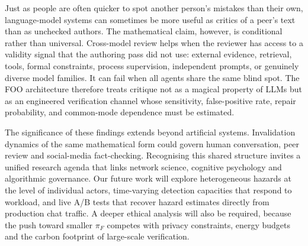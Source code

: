 \documentclass[12pt]{article}
\theoremstyle{definition}
\begin{document}
Just as people are often quicker to spot another person's mistakes than their
own, language-model systems can sometimes be more useful as critics of a peer's
text than as unchecked authors.  The mathematical claim, however, is conditional
rather than universal.  Cross-model review helps when the reviewer has access to
a validity signal that the authoring pass did not use: external evidence,
retrieval, tools, formal constraints, process supervision, independent prompts,
or genuinely diverse model families.  It can fail when all agents share the same
blind spot.  The FOO architecture therefore treats critique not as a magical
property of LLMs but as an engineered verification channel whose sensitivity,
false-positive rate, repair probability, and common-mode dependence must be
estimated.

The significance of these findings extends beyond artificial systems.
Invalidation dynamics of the same mathematical form could govern human
conversation, peer review and social-media fact-checking.  Recognising
this shared structure invites a unified research agenda that links
network science, cognitive psychology and algorithmic governance.  Our
future work will explore heterogeneous hazards at the level of
individual actors, time-varying detection capacities that respond to
workload, and live A/B tests that recover hazard estimates directly from
production chat traffic.  A deeper ethical analysis will also be
required, because the push toward smaller \(\pi_{F}\) competes with
privacy constraints, energy budgets and the carbon footprint of
large-scale verification.
\end{document}
